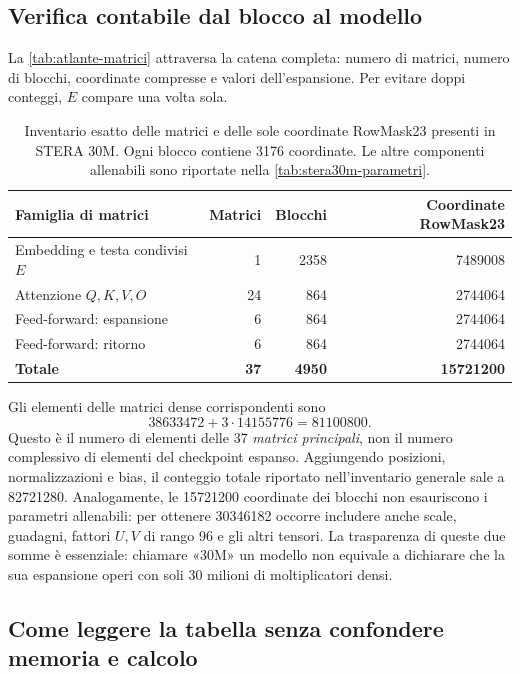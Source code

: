 \subsection{Verifica contabile dal blocco al modello}
\label{sec:contabilita-matrici}

La \autoref{tab:atlante-matrici} attraversa la catena completa: numero di matrici, numero di blocchi, coordinate compresse e valori dell'espansione. Per evitare doppi conteggi, $E$ compare una volta sola.

\begin{table}[htbp]
\centering
\small
\begin{tabularx}{\linewidth}{Xrrr}
\toprule
Famiglia di matrici & Matrici & Blocchi & Coordinate RowMask23 \\
\midrule
Embedding e testa condivisi $E$ & 1 & \num{2358} & \num{7489008} \\
Attenzione $Q,K,V,O$ & 24 & \num{864} & \num{2744064} \\
Feed-forward: espansione & 6 & \num{864} & \num{2744064} \\
Feed-forward: ritorno & 6 & \num{864} & \num{2744064} \\
\midrule
\textbf{Totale} & \textbf{37} & \textbf{\num{4950}} & \textbf{\num{15721200}} \\
\bottomrule
\end{tabularx}
\caption{Inventario esatto delle matrici e delle sole coordinate RowMask23 presenti in STERA 30M. Ogni blocco contiene \num{3176} coordinate. Le altre componenti allenabili sono riportate nella \autoref{tab:stera30m-parametri}.}
\label{tab:atlante-matrici}
\end{table}

Gli elementi delle matrici dense corrispondenti sono
\[
\num{38633472}+3\cdot\num{14155776}
=\num{81100800}.
\]
Questo è il numero di elementi delle 37 \emph{matrici principali}, non il numero complessivo di elementi del checkpoint espanso. Aggiungendo posizioni, normalizzazioni e bias, il conteggio totale riportato nell'inventario generale sale a \num{82721280}. Analogamente, le \num{15721200} coordinate dei blocchi non esauriscono i parametri allenabili: per ottenere \num{30346182} occorre includere anche scale, guadagni, fattori $U,V$ di rango 96 e gli altri tensori. La trasparenza di queste due somme è essenziale: chiamare «30M» un modello non equivale a dichiarare che la sua espansione operi con soli 30 milioni di moltiplicatori densi.

\subsection{Come leggere la tabella senza confondere memoria e calcolo}

